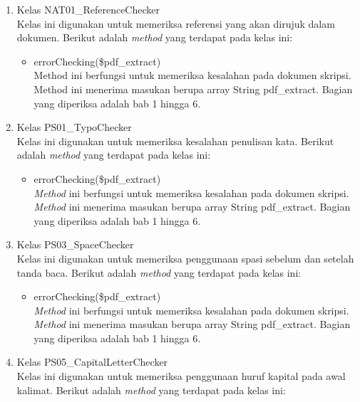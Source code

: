\begin{enumerate}
	\item Kelas NAT01\_ReferenceChecker \\
	Kelas ini digunakan untuk memeriksa referensi yang akan dirujuk dalam dokumen. Berikut adalah \textit{method} yang terdapat pada kelas ini:
	
		\begin{itemize}
			\item errorChecking(\$pdf\_extract) \\
			Method ini berfungsi untuk memeriksa kesalahan pada dokumen skripsi. Method ini menerima masukan berupa array String pdf\_extract. Bagian yang diperiksa adalah bab 1 hingga 6.
		\end{itemize}
			
	\item Kelas PS01\_TypoChecker \\
	Kelas ini digunakan untuk memeriksa kesalahan penulisan kata. Berikut adalah \textit{method} yang terdapat pada kelas ini:
	
		\begin{itemize}
			\item errorChecking(\$pdf\_extract) \\
			\textit{Method} ini berfungsi untuk memeriksa kesalahan pada dokumen skripsi. \textit{Method} ini menerima masukan berupa array String pdf\_extract. Bagian yang diperiksa adalah bab 1 hingga 6.
		\end{itemize}
			
	\item Kelas PS03\_SpaceChecker \\
	Kelas ini digunakan untuk memeriksa penggunaan spasi sebelum dan setelah tanda baca. Berikut adalah \textit{method} yang terdapat pada kelas ini:	
	
		\begin{itemize}
			\item errorChecking(\$pdf\_extract) \\
			\textit{Method} ini berfungsi untuk memeriksa kesalahan pada dokumen skripsi. \textit{Method} ini menerima masukan berupa array String pdf\_extract. Bagian yang diperiksa adalah bab 1 hingga 6.
		\end{itemize}
			
	\item Kelas PS05\_CapitalLetterChecker \\
	Kelas ini digunakan untuk memeriksa penggunaan huruf kapital pada awal kalimat. Berikut adalah \textit{method} yang terdapat pada kelas ini:
		

\end{enumerate}
